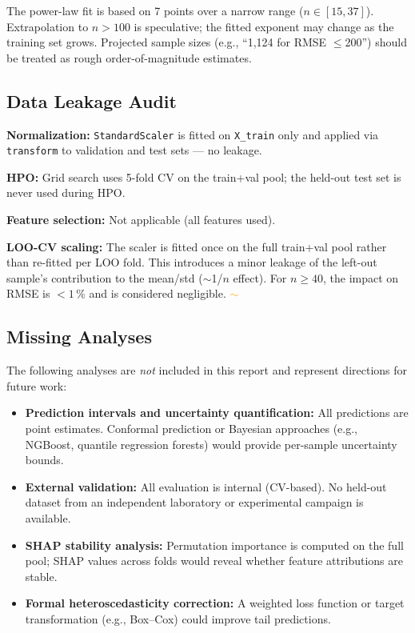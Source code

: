 \documentclass[12pt,a4paper]{article}
\begin{document}
The power-law fit is based on 7 points over a narrow range
($n \in [15, 37]$).  Extrapolation to $n > 100$ is speculative;
the fitted exponent may change as the training set grows.  Projected
sample sizes (e.g., ``1,124 for RMSE $\leq$200'') should be treated
as rough order-of-magnitude estimates.

\subsection{Data Leakage Audit}

\textbf{Normalization:}  \texttt{StandardScaler} is fitted on
\texttt{X\_train} only and applied via \texttt{transform} to validation
and test sets — no leakage.  \checkmark

\textbf{HPO:}  Grid search uses 5-fold CV on the train+val pool; the
held-out test set is never used during HPO.  \checkmark

\textbf{Feature selection:}  Not applicable (all features used).  \checkmark

\textbf{LOO-CV scaling:}  The scaler is fitted once on the full train+val
pool rather than re-fitted per LOO fold.  This introduces a minor
leakage of the left-out sample's contribution to the mean/std
($\sim$1/$n$ effect).  For $n \geq 40$, the impact on RMSE is
$< 1$\,\% and is considered negligible.  \textcolor{orange}{$\sim$}

\subsection{Missing Analyses}

The following analyses are \emph{not} included in this report and
represent directions for future work:

\begin{itemize}[leftmargin=*]
  \item \textbf{Prediction intervals and uncertainty quantification:}
        All predictions are point estimates.  Conformal prediction or
        Bayesian approaches (e.g., NGBoost, quantile regression forests)
        would provide per-sample uncertainty bounds.
  \item \textbf{External validation:}  All evaluation is internal
        (CV-based).  No held-out dataset from an independent laboratory
        or experimental campaign is available.
  \item \textbf{SHAP stability analysis:}  Permutation importance is
        computed on the full pool; SHAP values across folds would reveal
        whether feature attributions are stable.
  \item \textbf{Formal heteroscedasticity correction:}  A weighted
        loss function or target transformation (e.g., Box--Cox) could
        improve tail predictions.
\end{itemize}
\end{document}

